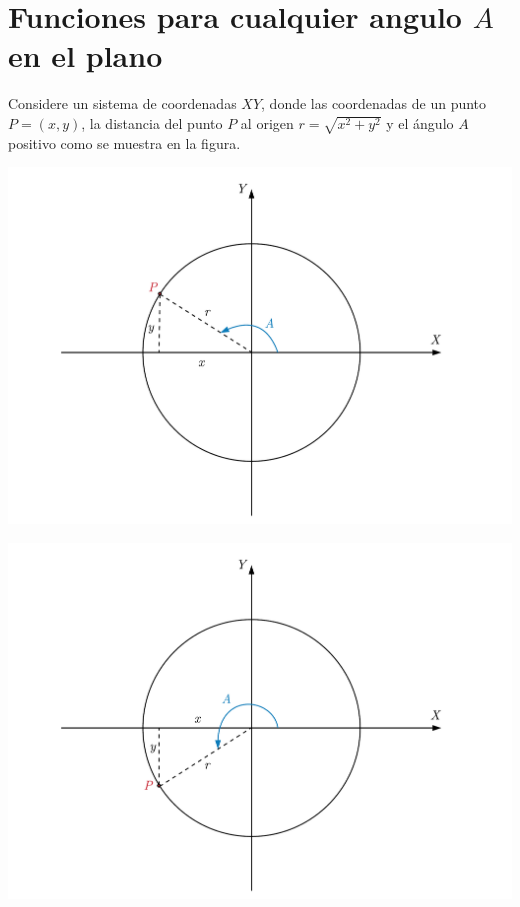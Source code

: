 \section*{Funciones para cualquier angulo $A$ en el plano}
Considere un sistema de coordenadas $XY$, donde las coordenadas de un punto $P=(x,y)$, la distancia del punto $P$ al origen $r=\sqrt{x^2+y^2}$ y el ángulo $A$ positivo como se muestra en la figura.
\begin{minipage}[c]{0.5\textwidth}
\begin{center}
\includegraphics[scale=0.35]{figuras/p1}
\end{center}
\end{minipage}  \begin{minipage}[c]{0.5\textwidth}
\begin{center}
\includegraphics[scale=0.35]{figuras/p2}
\end{center}
\end{minipage} 
\clearpage 

